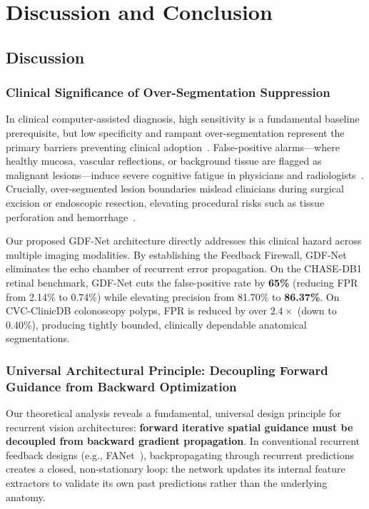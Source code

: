 \section{Discussion and Conclusion}
\label{sec:conclusion}

\subsection{Discussion}

\subsubsection{Clinical Significance of Over-Segmentation Suppression}
In clinical computer-assisted diagnosis, high sensitivity is a fundamental baseline prerequisite, but low specificity and rampant over-segmentation represent the primary barriers preventing clinical adoption~\cite{leufkens2012factors, mori2019real}. False-positive alarms---where healthy mucosa, vascular reflections, or background tissue are flagged as malignant lesions---induce severe cognitive fatigue in physicians and radiologists~\cite{mori2019real, hassan2021overcoming}. Crucially, over-segmented lesion boundaries mislead clinicians during surgical excision or endoscopic resection, elevating procedural risks such as tissue perforation and hemorrhage~\cite{rex2017colorectal}.

Our proposed GDF-Net architecture directly addresses this clinical hazard across multiple imaging modalities. By establishing the Feedback Firewall, GDF-Net eliminates the echo chamber of recurrent error propagation. On the CHASE-DB1 retinal benchmark, GDF-Net cuts the false-positive rate by \textbf{65\%} (reducing FPR from 2.14\% to 0.74\%) while elevating precision from 81.70\% to \textbf{86.37\%}. On CVC-ClinicDB colonoscopy polyps, FPR is reduced by over $2.4\times$ (down to 0.40\%), producing tightly bounded, clinically dependable anatomical segmentations.

\subsubsection{Universal Architectural Principle: Decoupling Forward Guidance from Backward Optimization}
Our theoretical analysis reveals a fundamental, universal design principle for recurrent vision architectures: \textbf{forward iterative spatial guidance must be decoupled from backward gradient propagation}. In conventional recurrent feedback designs (e.g., FANet~\cite{tomar2021fanet}), backpropagating through recurrent predictions creates a closed, non-stationary loop: the network updates its internal feature extractors to validate its own past predictions rather than the underlying anatomy.

